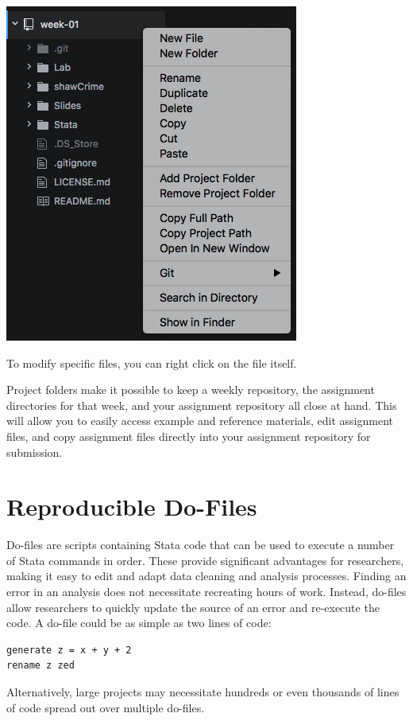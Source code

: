 \documentclass[]{book}
\begin{document}
\includegraphics[width=0.75\linewidth]{images/atomProject}

To modify specific files, you can right click on the file itself.

Project folders make it possible to keep a weekly repository, the
assignment directories for that week, and your assignment repository all
close at hand. This will allow you to easily access example and
reference materials, edit assignment files, and copy assignment files
directly into your assignment repository for submission.

\chapter{Reproducible Do-Files}\label{reproducible-do-files}

Do-files are scripts containing Stata code that can be used to execute a
number of Stata commands in order. These provide significant advantages
for researchers, making it easy to edit and adapt data cleaning and
analysis processes. Finding an error in an analysis does not necessitate
recreating hours of work. Instead, do-files allow researchers to quickly
update the source of an error and re-execute the code. A do-file could
be as simple as two lines of code:

\begin{verbatim}
generate z = x + y + 2
rename z zed
\end{verbatim}

Alternatively, large projects may necessitate hundreds or even thousands
of lines of code spread out over multiple do-files.
\end{document}
